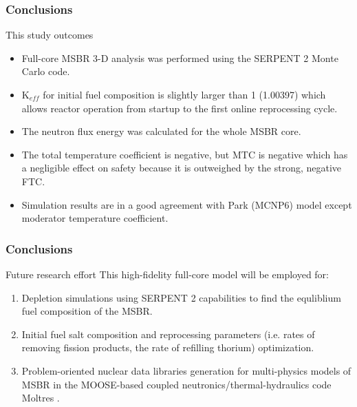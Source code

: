 \begin{frame}
  \frametitle{Conclusions}
        \begin{block}{This study outcomes}
        \begin{itemize}
                \item Full-core \gls{MSBR} 3-D analysis was performed using the SERPENT 2 Monte Carlo code.
                \item K$_{eff}$ for initial fuel composition is slightly larger than 1 (1.00397) which
                  allows reactor operation from startup to the first online reprocessing cycle.
                \item The neutron flux energy was calculated for the whole \gls{MSBR} core.
                \item The total temperature coefficient is negative, but MTC is negative which has a
                  negligible effect on safety because it is outweighed by the strong, negative FTC.
                \item Simulation results are in a good agreement with Park (MCNP6) model except moderator temperature
                  coefficient.
        \end{itemize}
        \end{block}
        
\end{frame}

\begin{frame}
  \frametitle{Conclusions}
         
              \begin{block}{Future research effort}
               This high-fidelity full-core model will be employed for:
               \begin{enumerate}
                \item Depletion simulations using SERPENT 2 capabilities to find the equliblium fuel composition of the \gls{MSBR}.
                \item Initial fuel salt composition and reprocessing parameters (i.e. rates of removing fission products,
                  the rate of refilling thorium) optimization.
                \item Problem-oriented nuclear data libraries generation for multi-physics models of \gls{MSBR} in the
                  MOOSE-based coupled neutronics/thermal-hydraulics code Moltres \cite{lindsay_arfc/moltres:_2017}.
               \end{enumerate}
               \end{block}
\end{frame}
